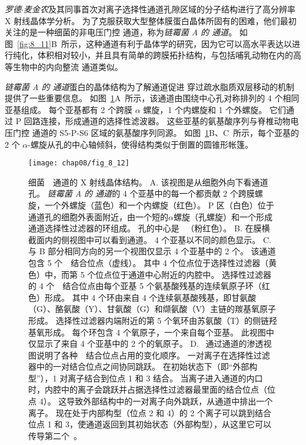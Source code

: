 \textit{罗德$\cdot$麦金农}及其同事首次对离子选择性通道孔隙区域的分子结构进行了高分辨率 X 射线晶体学分析。
为了克服获取大型整体膜蛋白晶体所固有的困难，他们最初关注的是一种细菌的非电压门控  通道，称为\textit{链霉菌 A 的  通道}。
如图~\ref{fig:8_11}B~所示，这种通道有利于晶体学的研究，因为它可以高水平表达以进行纯化，体积相对较小，并且具有简单的跨膜拓扑结构，与包括哺乳动物在内的高等生物中的内向整流 通道类似。


\textit{链霉菌 A 的  通道}蛋白的晶体结构为了解通道促进  穿过疏水脂质双层移动的机制提供了一些重要信息。
如图~\ref{fig:8_12}A~所示，该通道由围绕中心孔对称排列的 4 个相同亚基组成。
每个亚基都有 2 个跨膜 $\alpha$ 螺旋，1 个内螺旋和 1 个外螺旋。
它们通过 P 回路连接，形成通道的选择性滤波器。
这些亚基的氨基酸序列与脊椎动物电压门控  通道的 S5-P-S6 区域的氨基酸序列同源。
如图~\ref{fig:8_12}B、C~所示，每个亚基的 2 个 $\alpha$-螺旋从孔的中心轴倾斜，使得结构类似于倒置的圆锥形帐篷。


\begin{figure}[htbp]
	\centering
	\texttt{[image: chap08/fig\_8\_12]}
	\caption{细菌~~通道的 X 射线晶体结构\cite{doyle1998structure}。
		A. 该视图是从细胞外向下看通道孔。
		\textit{链霉菌 A 的  通道}的 4 个亚基中的每一个都贡献 2 个跨膜螺旋，一个外螺旋（蓝色）和一个内螺旋（红色）。
		P 区（白色）位于通道孔的细胞外表面附近，由一个短的$\alpha$螺旋（孔螺旋）和一个形成通道选择性过滤器的环组成。
		孔的中心是~ （粉红色）。
		B. 在膜横截面内的侧视图中可以看到通道。
		4 个亚基以不同的颜色显示。
		C. 与 B 部分相同方向的另一个视图仅显示 4 个亚基中的 2 个。
		该通道包含 5 个~~结合位点（虚线）。
		其中 4 个位点位于选择性过滤器（黄色）中，而第 5 个位点位于通道中心附近的内腔中。
		选择性过滤器的 4 个~~结合位点由每个亚基 5 个氨基酸残基的连续氧原子环（红色）形成。
		其中 4 个环由来自 4 个连续氨基酸残基，即甘氨酸（G）、酪氨酸（Y）、甘氨酸（G）和缬氨酸（V）主链的羰基氧原子形成。
		选择性过滤器内端附近的第 5 个氧环由苏氨酸（T）的侧链羟基氧形成。
		每个环包含 4 个氧原子，一个来自每个亚基。
		此视图中仅显示了来自 4 个亚基中的 2 个的氧原子\cite{morais2001energetic}。
		D. ~通过通道的渗透视图说明了各种~~结合位点占用的变化顺序。
		一对离子在选择性过滤器中的一对结合位点之间协同跳跃。
		在初始状态下（即“外部构型”），1 对离子结合到位点 1 和 3 结合。
		当离子进入通道的内口时，内腔中的离子会跳跃并占据选择性过滤器最里面的结合位点（位点 4）。
		这导致外部结构中的一对离子向外跳跃，从通道中排出一个离子。
		现在处于内部构型（位点 2 和 4）的 2 个离子可以跳到结合位点 1 和 3，使通道返回到其初始状态（外部构型），从这里它可以传导第二个~\cite{miller2001see}。}
	\label{fig:8_12}
\end{figure}


